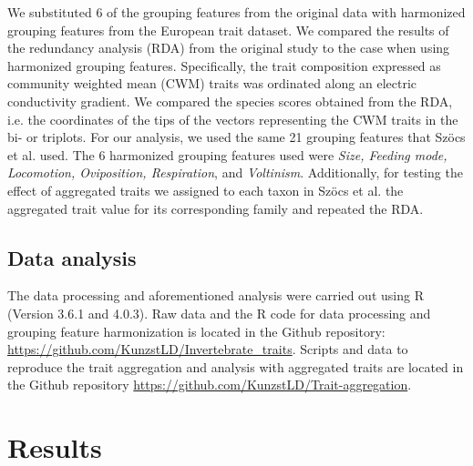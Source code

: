 \documentclass{article}
\begin{document}
We substituted 6 of the grouping features from the original data with harmonized grouping features from the European trait dataset. We compared the results of the redundancy analysis (RDA) from the original study to the case when using harmonized grouping features. Specifically, the trait composition expressed as community weighted mean (CWM) traits was ordinated along an electric conductivity gradient. We compared the species scores obtained from the RDA, i.e. the coordinates of the tips of the vectors representing the CWM traits in the bi- or triplots. For our analysis, we used the same 21 grouping features that Szöcs et al. \cite{szocs_effects_2014} used. The 6 harmonized grouping features used were \textit{Size, Feeding mode, Locomotion, Oviposition, Respiration}, and \textit{Voltinism}. %
Additionally, for testing the effect of aggregated traits we assigned to each taxon in Szöcs et al. \cite{szocs_effects_2014} the aggregated trait value for its corresponding family and repeated the RDA.  


\subsection*{Data analysis}

The data processing and aforementioned analysis were carried out using R (Version 3.6.1 and 4.0.3). Raw data and the R code for data processing and grouping feature harmonization is located in the Github repository: \url{https://github.com/KunzstLD/Invertebrate_traits}. Scripts and data to reproduce the trait aggregation and analysis with aggregated traits are located in the Github repository \url{https://github.com/KunzstLD/Trait-aggregation}.


\newpage
\section*{Results}


\end{document}
